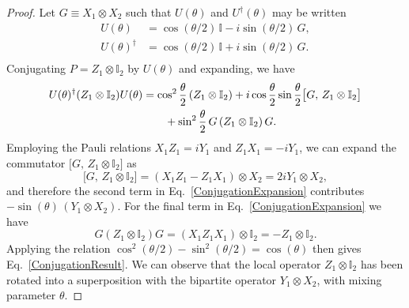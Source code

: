 \documentclass[10pt,a4paper]{amsart}
\begin{document}
\begin{proof}
Let $G \equiv X_1\otimes X_2$ such that $U(\theta)$ and $U^{\dagger}(\theta)$ may be written
%
\begin{equation}\label{Rewriting}
\begin{split}
    U(\theta) &= \cos(\theta/2)\,\mathbb{I} - i\sin(\theta/2)\,G,\\
    U(\theta)^\dagger &= \cos(\theta/2)\,\mathbb{I} + i\sin(\theta/2)\,G.\\
\end{split}
\end{equation}
%
Conjugating $P = Z_1\otimes\mathbb{I}_2$ by $U(\theta)$ and expanding, we have
%
\begin{align}\label{ConjugationExpansion}
U(\theta)^\dagger(Z_1\otimes\mathbb{I}_2)U(\theta) &= \cos^2\frac{\theta}{2}\,(Z_1\otimes\mathbb{I}_2) + i\cos\frac{\theta}{2}\sin\frac{\theta}{2}\bigl[G,\,Z_1\otimes\mathbb{I}_2\bigr] \notag\\
&\quad \quad + \sin^2\frac{\theta}{2}\,G\,(Z_1\otimes\mathbb{I}_2)\,G.
\end{align}
%
Employing the Pauli relations $X_1 Z_1 = iY_1$ and $Z_1 X_1 = -iY_1$, we can expand the commutator $\bigl[G,\,Z_1\otimes\mathbb{I}_2\bigr]$ as
%
\begin{equation}
\bigl[G,\,Z_1\otimes\mathbb{I}_2\bigr] = (X_1 Z_1 - Z_1 X_1)\otimes X_2 = 2iY_1\otimes X_2,
\end{equation}
%
and therefore the second term in Eq.\ \eqref{ConjugationExpansion} contributes
$-\sin(\theta)\,(Y_1\otimes X_2)$. For the final term in Eq.\ \eqref{ConjugationExpansion} we have
%
\begin{equation}
    G(Z_1\otimes\mathbb{I}_2)G = (X_1 Z_1 X_1)\otimes\mathbb{I}_2 = -Z_1\otimes\mathbb{I}_2.
\end{equation}
%
Applying the relation $\cos^2(\theta/2) - \sin^2(\theta/2) = \cos(\theta)$ then gives Eq.\ \eqref{ConjugationResult}. We can observe that the local operator $Z_1\otimes\mathbb{I}_2$ has been rotated into a superposition with the bipartite operator $Y_1\otimes X_2$, with mixing parameter $\theta$.


\end{proof}
\end{document}
